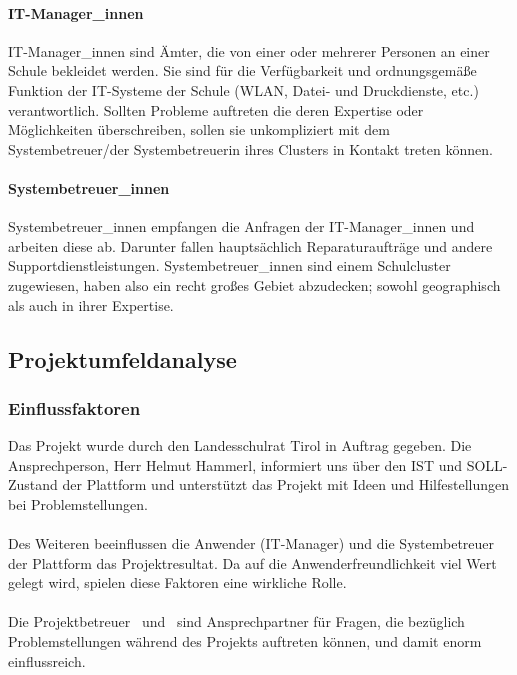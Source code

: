 \paragraph{IT-Manager\_innen}
IT-Manager\_innen sind \glqq Ämter\grqq, die von einer oder mehrerer Personen an einer Schule bekleidet werden. Sie sind für die Verfügbarkeit und ordnungsgemäße Funktion der IT-Systeme der Schule (WLAN, Datei- und Druckdienste, etc.) verantwortlich. Sollten Probleme auftreten die deren Expertise oder Möglichkeiten überschreiben, sollen sie unkompliziert mit dem Systembetreuer/der Systembetreuerin ihres Clusters in Kontakt treten können.

\paragraph{Systembetreuer\_innen}
Systembetreuer\_innen empfangen die Anfragen der IT-Manager\_innen und arbeiten diese ab. Darunter fallen hauptsächlich Reparaturaufträge und andere Supportdienstleistungen. Systembetreuer\_innen sind einem Schulcluster zugewiesen, haben also ein recht großes Gebiet abzudecken; sowohl geographisch als auch in ihrer Expertise.

\subsection{Projektumfeldanalyse}
\subsubsection{Einflussfaktoren}
Das Projekt wurde durch den Landesschulrat Tirol in Auftrag gegeben. Die Ansprechperson, Herr Helmut Hammerl, informiert uns über den IST und SOLL-Zustand der Plattform und unterstützt das Projekt mit Ideen und Hilfestellungen bei Problemstellungen.
\paragraph{}
Des Weiteren beeinflussen die Anwender (IT-Manager) und die Systembetreuer der Plattform das Projektresultat. Da auf die Anwenderfreundlichkeit viel Wert gelegt wird, spielen diese Faktoren eine wirkliche Rolle.
\paragraph{}
Die Projektbetreuer \getSteff\ und \getAlex\ sind Ansprechpartner für Fragen, die bezüglich Problemstellungen während des Projekts auftreten können, und damit enorm einflussreich.

